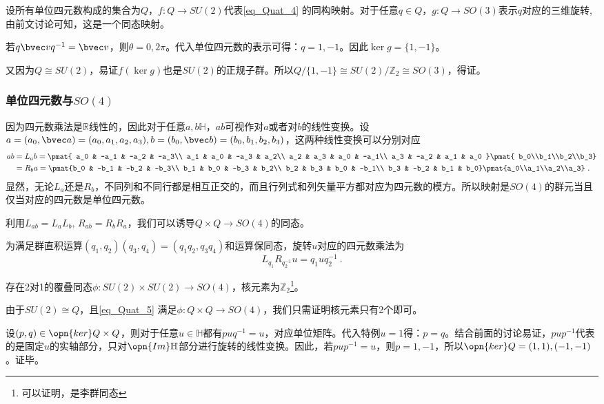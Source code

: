 设所有单位四元数构成的集合为$Q$，$f:Q\to SU(2)$代表\autoref{eq_Quat_4} 的同构映射。对于任意$q\in Q$，$g:Q\to SO(3)$表示$q$对应的三维旋转,由前文讨论可知，这是一个同态映射。

若$q\bvec vq^{-1}=\bvec v$，则$\theta=0,2\pi$。代入单位四元数的表示可得：$q=1,-1$。因此$\ker g=\{1,-1\}$。

又因为$Q\cong SU(2)$，易证$f(\ker g)$也是$SU(2)$的正规子群。所以$Q/\{1,-1\}\cong SU(2)/\mathbb Z_2\cong SO(3)$，得证。
\subsubsection{单位四元数与$SO(4)$}
因为四元数乘法是$\mathbb R$线性的，因此对于任意$a,b\mathbb H$，$ab$可视作对$a$或者对$b$的线性变换。设$a=(a_0,\bvec a)=(a_0,a_1,a_2,a_3),b=(b_0,\bvec b)=(b_0,b_1,b_2,b_3)$，这两种线性变换可以分别对应
\begin{equation}
\begin{aligned}
ab &=L_ab= \pmat{
a_0 & -a_1 & -a_2 & -a_3\\
a_1 & a_0 & -a_3 & a_2\\
a_2 & a_3 & a_0 & -a_1\\
a_3 & -a_2 & a_1 & a_0
}\pmat{
b_0\\b_1\\b_2\\b_3}\\
&= R_ba=\pmat{b_0 & -b_1 & -b_2 & -b_3\\
b_1 & b_0 & -b_3 & b_2\\
b_2 & b_3 & b_0 & -b_1\\
b_3 & -b_2 & b_1 & b_0}\pmat{a_0\\a_1\\a_2\\a_3}~.
\end{aligned}
\end{equation}
显然，无论$L_a$还是$R_b$，不同列和不同行都是相互正交的，而且行列式和列矢量平方都对应为四元数的模方。所以映射是$SO(4)$的群元当且仅当对应的四元数是单位四元数。

利用$L_{ab}=L_aL_b,\,R_{ab}=R_bR_a$，我们可以诱导$Q\times Q\to SO(4)$的同态。

为满足群直积运算$(q_1,q_2)(q_3,q_4)=(q_1q_2,q_3q_4)$和运算保同态，旋转$u$对应的四元数乘法为
\begin{equation}\label{eq_Quat_5}
L_{q_1}R_{q_2^{-1}}u=q_1uq_2^{-1}~.
\end{equation}
\begin{theorem}{}
存在2对1的覆叠同态$\phi:SU(2)\times SU(2)\to SO(4)$，核元素为$\mathbb Z_2$\footnote{可以证明，是李群同态}。
\end{theorem}

由于$SU(2)\cong Q$，且\autoref{eq_Quat_5} 满足$\phi:Q\times Q\to SO(4)$，我们只需证明核元素只有2个即可。

设$(p,q)\in \opn{ker}Q\times Q$，则对于任意$u\in \mathbb H$都有$puq^{-1}=u$，对应单位矩阵。代入特例$u=1$得：$p=q$。结合前面的讨论易证，$pup^{-1}$代表的是固定$u$的实轴部分，只对$\opn{Im}\mathbb H$部分进行旋转的线性变换。因此，若$pup^{-1}=u$，则$p=1,-1$，所以$\opn{ker}Q=(1,1),(-1,-1)$。证毕。